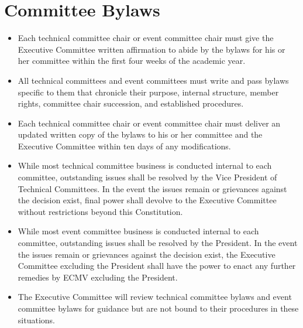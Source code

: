 \documentclass[12pt]{constitution}
\begin{document}
\section{Committee Bylaws}
\label{sec:amend_techbylaw}
\begin{itemize}
    \item Each technical committee chair or event committee chair must give the Executive Committee written affirmation to abide by the bylaws for his or her committee within the first four weeks of the academic year.
    \item All technical committees and event committees must write and pass bylaws specific to them that chronicle their purpose, internal structure, member rights, committee chair succession, and established procedures.
    \item Each technical committee chair or event committee chair must deliver an updated written copy of the bylaws to his or her committee and the Executive Committee within ten days of any modifications.
    \item While most technical committee business is conducted internal to each committee, outstanding issues shall be resolved by the Vice President of Technical Committees. In the event the issues remain or grievances against the decision exist, final power shall devolve to the Executive Committee without restrictions beyond this Constitution.
    \item While most event committee business is conducted internal to each committee, outstanding issues shall be resolved by the President. In the event the issues remain or grievances against the decision exist, the Executive Committee excluding the President shall have the power to enact any further remedies by ECMV excluding the President.
    \item The Executive Committee will review technical committee bylaws and event committee bylaws for guidance but are not bound to their procedures in these situations.
\end{itemize}


\label{art:dues}
\end{document}
